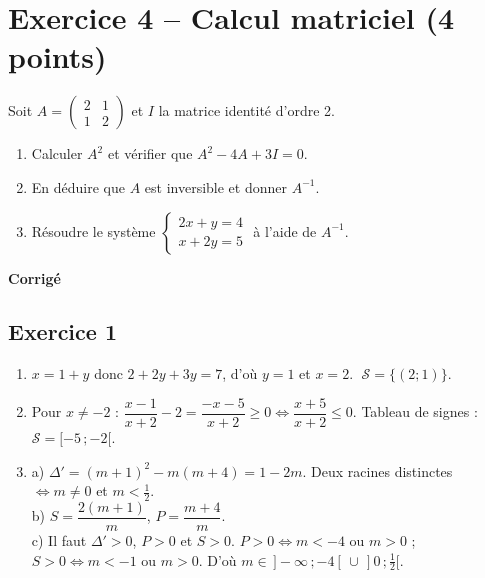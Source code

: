 \documentclass[11pt,a4paper]{article}
\begin{document}
\section*{Exercice 4 -- Calcul matriciel (4 points)}
Soit $A = \begin{pmatrix} 2 & 1\\ 1 & 2\end{pmatrix}$ et $I$ la matrice identité d'ordre 2.
\begin{enumerate}
  \item Calculer $A^2$ et vérifier que $A^2 - 4A + 3I = 0$.
  \item En déduire que $A$ est inversible et donner $A^{-1}$.
  \item Résoudre le système $\begin{cases} 2x + y = 4\\ x + 2y = 5\end{cases}$ à l'aide de $A^{-1}$.
\end{enumerate}

\newpage
\begin{center}{\Large\bfseries Corrigé}\end{center}

\subsection*{Exercice 1}
\begin{enumerate}
  \item $x = 1 + y$ donc $2 + 2y + 3y = 7$, d'où $y = 1$ et $x = 2$. $\;\mathcal{S} = \{(2;1)\}$.
  \item Pour $x \neq -2$ : $\dfrac{x-1}{x+2} - 2 = \dfrac{-x-5}{x+2} \geqslant 0 \iff \dfrac{x+5}{x+2} \leqslant 0$.
  Tableau de signes : $\mathcal{S} = [-5\,;-2[$.
  \item a) $\Delta' = (m+1)^2 - m(m+4) = 1 - 2m$. Deux racines distinctes $\iff m \neq 0$ et $m < \tfrac12$.\\
  b) $S = \dfrac{2(m+1)}{m}$, \quad $P = \dfrac{m+4}{m}$.\\
  c) Il faut $\Delta' > 0$, $P > 0$ et $S > 0$.
  $P > 0 \iff m < -4$ ou $m > 0$ ; $S > 0 \iff m < -1$ ou $m > 0$.
  D'où $m \in \,]-\infty\,;-4[\,\cup\,]0\,;\tfrac12[$.
\end{enumerate}
\end{document}

